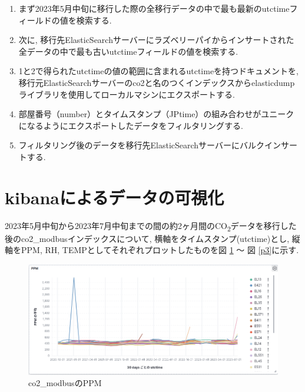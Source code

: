 \documentclass[a4j,12pt,]{jarticle}
\begin{document}
\begin{enumerate}
  \item まず2023年5月中旬に移行した際の全移行データの中で最も最新のutctimeフィールドの値を検索する.
  \item 次に, 移行先ElasticSearchサーバーにラズベリーパイからインサートされた全データの中で最も古いutctimeフィールドの値を検索する.
  \item 1と2で得られたutctimeの値の範囲に含まれるutctimeを持つドキュメントを, 移行元ElasticSearchサーバーのco2と名のつくインデックスからelasticdump \cite{1}ライブラリを使用してローカルマシンにエクスポートする.
  \item 部屋番号（number）とタイムスタンプ（JPtime）の組み合わせがユニークになるようにエクスポートしたデータをフィルタリングする.
  \item フィルタリング後のデータを移行先ElasticSearchサーバーにバルクインサートする.
\end{enumerate}

\section{kibanaによるデータの可視化}

2023年5月中旬から2023年7月中旬までの間の約2ヶ月間のCO\textsubscript{2}データを移行した後のco2\_modbusインデックスについて, 横軸をタイムスタンプ(utctime)とし, 縦軸をPPM, RH, TEMPとしてそれぞれプロットしたものを図 \ref{p1} 〜 図 \ref{p3}に示す.

\begin{figure}[H]
  \begin{center}
    \includegraphics[width=160mm]{ppm.png}
    \caption{co2\_modbusのPPM}
    \label{p1}
  \end{center}
\end{figure}
\end{document}
